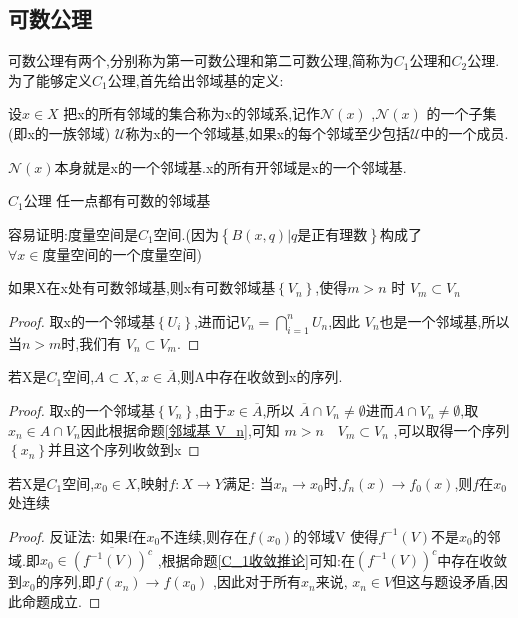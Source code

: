 \subsection*{可数公理}
可数公理有两个,分别称为第一可数公理和第二可数公理,简称为\(C_1\)公理和\(C_2\)公理.
为了能够定义\(C_1\)公理,首先给出邻域基的定义:
\begin{definition}
    设\(x \in X\) 把x的所有邻域的集合称为x的邻域系,记作\(\mathscr{N} (x)\) ,\(\mathscr{N} (x)\) 的一个子集(即x的一族邻域) \(\mathscr{U}\)称为x的一个邻域基,如果x的每个邻域至少包括\(\mathscr{U}\)中的一个成员.
\end{definition}
\begin{example}
    \(\mathscr{N}(x)\)本身就是x的一个邻域基.x的所有开邻域是x的一个邻域基.
\end{example}
\begin{definition}
    \(C_1\mathbf{公理}\) 任一点都有可数的邻域基
\end{definition}
容易证明:度量空间是\(C_1\)空间.(因为\(\left\{B(x,q)| q\text{是正有理数}\right\}\)构成了\(\forall x \in \text{度量空间}\)的一个度量空间)
\begin{corollary}\label{邻域基 V_n}
    如果X在x处有可数邻域基,则x有可数邻域基\(\left\{V_n\right\}\),使得\(m > n \) 时 \(V_m \subset V_n\)
\end{corollary}
\begin{proof}
    取x的一个邻域基\(\left\{U_i\right\}\),进而记\(V_n =\bigcap_{i=1}^{n}U_n\),因此 \(V_n\)也是一个邻域基,所以当\(n>m\)时,我们有 \(V_n \subset V_m\).
\end{proof}
\begin{corollary}\label{C_1收敛推论}
    若X是\(C_1\)空间,\(A\subset X,x \in \overline{A}\),则A中存在收敛到x的序列.
\end{corollary}
\begin{proof}
    取x的一个邻域基\(\left\{V_n\right\}\),由于\(x \in \overline{A}\),所以 \(\overline{A} \cap V_n \neq \emptyset \)进而\(A \cap V_n \neq \emptyset\),取\(x_n \in A \cap V_n\)因此根据命题\ref{邻域基 V_n},可知 \(m >n \quad V_m \subset V_n\) ,可以取得一个序列\(\left\{x_n\right\}\)并且这个序列收敛到x
\end{proof}
\begin{lemma}
    若X是\(C_1\)空间,\(x_0 \in X\),映射\(f: X \rightarrow Y \)满足: 当\(x_n \rightarrow x_0\)时,\(f_n(x)  \rightarrow f_0(x)\),则\(f\)在\(x_0\)处连续
\end{lemma}
\begin{proof}
    反证法: 如果f在\(x_0\)不连续,则存在\(f(x_0)\)的邻域V 使得\(f^{-1}(V)\)不是\(x_0\)的邻域.即\(x_0 \in \overline{(f^{-1}(V))^{c}}\) ,根据命题\ref{C_1收敛推论}可知:在\((f^{-1}(V))^{c}\)中存在收敛到\(x_0\)的序列,即\(f(x_n) \rightarrow f(x_0)\) ,因此对于所有\(x_n\)来说, \(x_n \in V \)但这与题设矛盾,因此命题成立.
\end{proof}
